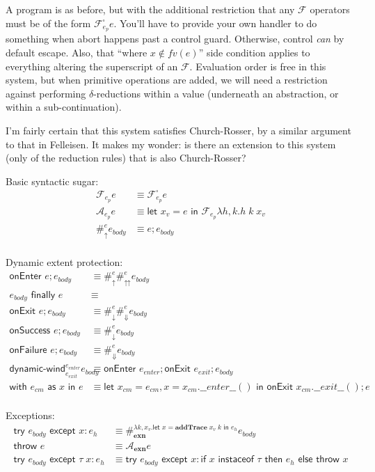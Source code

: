 \documentclass[11pt]{article}
\newcommand{\letin}[2]{\textsf{let }#1\textsf{ in }#2}
\newcommand\F{\mathcal{F}}
\begin{document}
A program is as before, but with the additional restriction that any $\F$ operators must be of the form $\F^\square_{e_p}e$.
You'll have to provide your own handler to do something when abort happens past a control guard. Otherwise, control \emph{can} by default escape.
Also, that ``where $x \notin fv(e)$'' side condition applies to everything altering the superscript of an $\F$.
Evaluation order is free in this system, but when primitive operations are added, we will need a restriction against performing $\delta$-reductions within a value (underneath an abstraction, or within a sub-continuation).

I'm fairly certain that this system satisfies Church-Rosser, by a similar argument to that in Felleisen.
It makes my wonder: is there an extension to this system (only of the reduction rules) that is also Church-Rosser?

Basic syntactic sugar:
\begin{align*}
\F_{e_p}e &\equiv \F_{e_p}^\square e \\
\mathcal A_{e_p}e &\equiv
	\letin{x_v=e}{\F_{e_p}\lambda h,k.h\;k\;x_v}
	\\
\#_\uparrow^ee_{body} &\equiv
	e; e_{body}
	\\
\end{align*}

Dynamic extent protection:
\begin{align*}
\textsf{onEnter }e; e_{body} &\equiv
	\#_\uparrow^e\#_\upuparrows^ee_{body}
	\\
e_{body}\textsf{ finally }e &\equiv \\
	\textsf{onExit }e; e_{body} &\equiv
	\#_\downarrow^e\#_\Downarrow^ee_{body}
	\\
\textsf{onSuccess }e; e_{body} &\equiv
	\#_\downarrow^ee_{body}
	\\
\textsf{onFailure }e; e_{body} &\equiv
	\#_\Downarrow^ee_{body}
	\\
\textsf{dynamic-wind}^{e_{enter}}_{e_{exit}}e_{body} &\equiv
	\textsf{onEnter }e_{enter}; \textsf{onExit }e_{exit}; e_{body}
	\\
\textsf{with }e_{cm}\textsf{ as }x\textsf{ in }e &\equiv
	\letin{x_{cm}=e_{cm},x=x_{cm}.\_\_enter\_\_()}{\textsf{onExit }x_{cm}.\_\_exit\_\_(); e}
	\\
\end{align*}

Exceptions:
\begin{align*}
\textsf{try }e_{body}\textsf{ except }x:e_h &\equiv
	\#_\textbf{exn}^{\lambda k,x_v.\letin{x=\textbf{addTrace}\;x_v\;k}{e_h}}e_{body}
	\\
\textsf{throw }e &\equiv
	\mathcal A_\textbf{exn}e
	\\
\textsf{try }e_{body}\textsf{ except }\tau\;x:e_h &\equiv
	\textsf{try }e_{body}\textsf{ except }x:
		\textsf{if }x\textsf{ instaceof }\tau
		\textsf{ then }e_h
		\textsf{ else throw }x
	\\
\end{align*}
\end{document}
